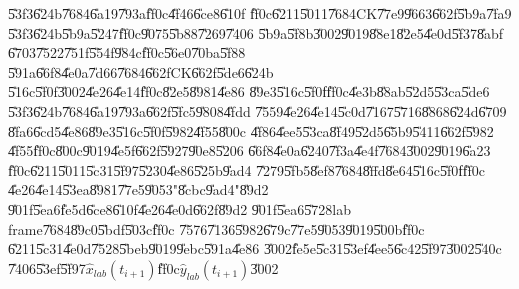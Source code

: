 \documentclass[12pt,a4paper]{article}
\begin{document}
\U{53f3}\U{624b}\U{7684}\U{6a19}\U{793a}\U{ff0c}\U{4f46}\U{6ce8}\U{610f}%
\U{ff0c}\U{6211}\U{5011}\U{7684}CK\U{77e9}\U{9663}\U{662f}\U{5b9a}\U{7fa9}%
\U{53f3}\U{624b}\U{5b9a}\U{5247}\U{ff0c}\U{9075}\U{5b88}\U{7269}\U{7406}%
\U{5b9a}\U{5f8b}\U{3002}\U{9019}\U{88e1}\U{82e5}\U{4e0d}\U{5f37}\U{8abf}%
\U{6703}\U{7522}\U{751f}\U{554f}\U{984c}\U{ff0c}\U{56e0}\U{70ba}\U{5f88}%
\U{591a}\U{66f8}\U{4e0a}\U{7d66}\U{7684}\U{662f}CK\U{662f}\U{5de6}\U{624b}%
\U{516c}\U{5f0f}\U{3002}\U{4e26}\U{4e14}\U{ff0c}\U{82e5}\U{8981}\U{4e86}%
\U{89e3}\U{516c}\U{5f0f}\U{ff0c}\U{4e3b}\U{88ab}\U{52d5}\U{53ca}\U{5de6}%
\U{53f3}\U{624b}\U{7684}\U{6a19}\U{793a}\U{662f}\U{5fc5}\U{9808}\U{4fdd}%
\U{7559}\U{4e26}\U{4e14}\U{5c0d}\U{7167}\U{5716}\U{8868}\U{624d}\U{6709}%
\U{8fa6}\U{6cd5}\U{4e86}\U{89e3}\U{516c}\U{5f0f}\U{5982}\U{4f55}\U{800c}%
\U{4f86}\U{4ee5}\U{53ca}\U{8f49}\U{52d5}\U{65b9}\U{5411}\U{662f}\U{5982}%
\U{4f55}\U{ff0c}\U{800c}\U{9019}\U{4e5f}\U{662f}\U{5927}\U{90e8}\U{5206}%
\U{66f8}\U{4e0a}\U{6240}\U{7f3a}\U{4e4f}\U{7684}\U{3002}\U{9019}\U{6a23}%
\U{ff0c}\U{6211}\U{5011}\U{5c31}\U{5f97}\U{5230}\U{4e86}\U{525b}\U{9ad4}%
\U{7279}\U{5fb5}\U{8ef8}\U{7684}\U{8ffd}\U{8e64}\U{516c}\U{5f0f}\U{ff0c}%
\U{4e26}\U{4e14}\U{53ea}\U{8981}\U{77e5}\U{9053}"\U{8cbc}\U{9ad4}"\U{89d2}%
\U{901f}\U{5ea6}\U{fe5d}\U{6ce8}\U{610f}\U{4e26}\U{4e0d}\U{662f}\U{89d2}%
\U{901f}\U{5ea6}\U{5728}lab frame\U{7684}\U{89c0}\U{5bdf}\U{503c}\U{ff0c}%
\U{7576}\U{7136}\U{5982}\U{679c}\U{77e5}\U{9053}\U{9019}\U{500b}\U{ff0c}%
\U{6211}\U{5c31}\U{4e0d}\U{7528}\U{5beb}\U{9019}\U{9ebc}\U{591a}\U{4e86}%
\U{3002}\U{fe5e}\U{5c31}\U{53ef}\U{4ee5}\U{6c42}\U{5f97}\U{3002}\U{540c}%
\U{7406}\U{53ef}\U{5f97}$\hat{x}_{lab}\left( t_{i+1}\right) $\U{ff0c}$\hat{y}%
_{lab}\left( t_{i+1}\right) $\U{3002}
\end{document}
